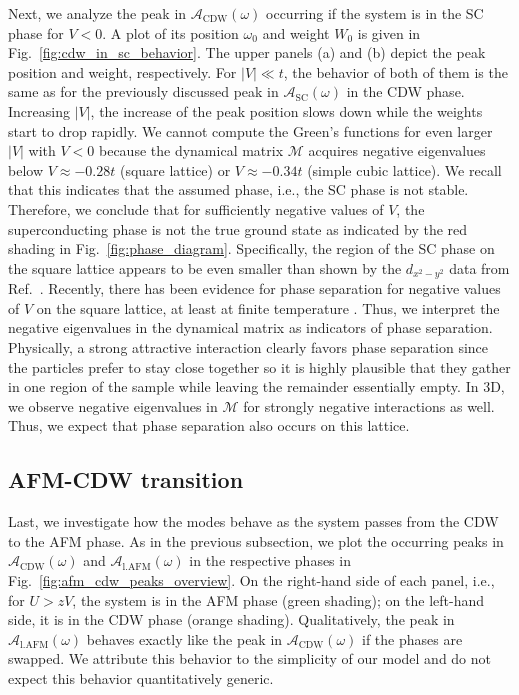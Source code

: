 \documentclass[
    reprint, 
    aps,
    preprintnumbers,
    twocolumn,
    prb,
    superscriptaddress
]{revtex4-2}
\newcommand{\mM}{\mathcal{M}}
\newcommand{\spectral}[1]{\mathcal{A}_\text{#1}  (\omega)}
\begin{document}
Next, we analyze the peak in $\spectral{CDW}$ occurring if the system is in the SC phase for $V<0$.
A plot of its position $\omega_0$ and weight $W_0$ is given in Fig.\ \ref{fig:cdw_in_sc_behavior}.
The upper panels (a) and (b) depict the peak position and weight, respectively.
For $|V| \ll t$, the behavior of both of them is the same as for the 
previously discussed peak in $\spectral{SC}$ in the CDW phase.
Increasing $|V|$, the increase of the peak position slows down while the weights start to drop rapidly.
We cannot compute the Green's functions for even larger $|V|$ with $V<0$ because the dynamical matrix $\mM$ 
acquires negative eigenvalues below $V\approx -0.28t$ (square lattice) or $V\approx -0.34t$ (simple cubic lattice). 
We recall that this indicates that the assumed phase, i.e., the SC phase is not stable. 
Therefore, we conclude that for sufficiently negative values of $V$, 
the superconducting phase is not the true ground state as indicated by the red shading in Fig.\ \ref{fig:phase_diagram}.
Specifically, the region of the SC phase on the square lattice 
appears to be even smaller than shown by the $d_{x^2 -y^2}$ data from Ref.\ \cite{Micnas88b}.
Recently, there has been evidence for phase separation for negative values of $V$ 
on the square lattice, at least at finite temperature \cite{Linner23}. 
Thus, we interpret the negative eigenvalues in the dynamical matrix as indicators of phase separation. 
Physically, a strong attractive interaction clearly favors phase separation since the particles prefer to stay close together 
so it is highly plausible that they gather in one region of the sample while leaving the remainder essentially empty.
In 3D, we observe negative eigenvalues in $\mM$ for strongly negative interactions as well.
Thus, we expect that phase separation also occurs on this lattice.



\subsection{AFM-CDW transition}

Last, we investigate how the modes behave as the system passes from the CDW to the AFM phase.
As in the previous subsection, we plot the occurring peaks in $\spectral{CDW}$ and 
$\spectral{l.AFM}$ in the respective phases in Fig.\ \ref{fig:afm_cdw_peaks_overview}.
On the right-hand side of each panel, i.e., for $U > zV$, the system is in the AFM phase (green shading);
on the left-hand side, it is in the CDW phase (orange shading).
Qualitatively, the peak in $\spectral{l.AFM}$ behaves exactly like the peak in 
$\spectral{CDW}$ if the phases are swapped.
We attribute this behavior to the simplicity of our model and do not expect this behavior quantitatively generic.
\end{document}
